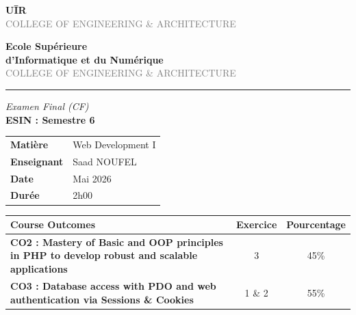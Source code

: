 \documentclass[11pt,a4paper]{article}
\begin{document}
\thispagestyle{empty}

\noindent
\begin{minipage}[c]{0.42\textwidth}
  \textcolor{uirblue}{\Large\bfseries U\={I}R}\\
  \textcolor{gray}{\footnotesize COLLEGE OF ENGINEERING \& ARCHITECTURE}
\end{minipage}%
\hfill
\begin{minipage}[c]{0.52\textwidth}
  \raggedleft
  \textcolor{uirblue}{\textbf{Ecole Supérieure}}\\
  \textcolor{uirblue}{\textbf{d'Informatique et du Numérique}}\\
  \textcolor{gray}{\footnotesize COLLEGE OF ENGINEERING \& ARCHITECTURE}
\end{minipage}

\vspace{6pt}
\noindent\rule{\linewidth}{0.8pt}
\vspace{4pt}

\begin{center}
  \textit{Examen Final (CF)}\\[6pt]
  {\LARGE\bfseries ESIN : Semestre 6}
\end{center}

\vspace{6pt}
\noindent
\begin{tabular}{ll}
  \textbf{Matière}     & Web Development I \\
  \textbf{Enseignant}  & Saad NOUFEL \\
  \textbf{Date}        & Mai 2026 \\
  \textbf{Durée}       & 2h00 \\
\end{tabular}

\vspace{8pt}

\begin{center}
\begin{tabular}{|>{\bfseries}p{10cm}|c|c|}
  \hline
  \rowcolor{uirblue!15}
  \textbf{Course Outcomes} & \textbf{Exercice} & \textbf{Pourcentage} \\
  \hline
  CO2 : Mastery of Basic and OOP principles in PHP to develop robust and scalable applications
    & 3 & 45\% \\
  \hline
  CO3 : Database access with PDO and web authentication via Sessions \& Cookies
    & 1 \& 2 & 55\% \\
  \hline
\end{tabular}
\end{center}
\end{document}
